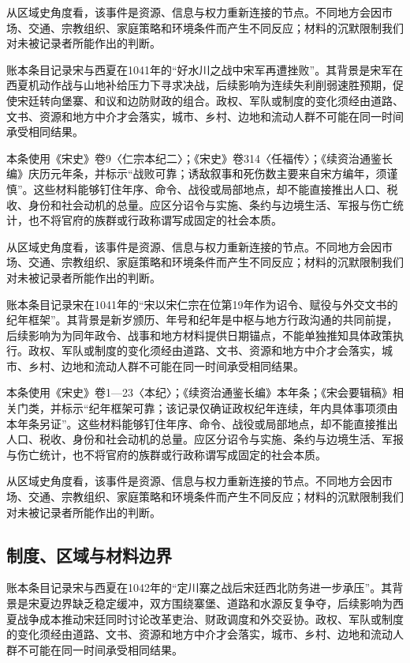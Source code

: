 从区域史角度看，该事件是资源、信息与权力重新连接的节点。不同地方会因市场、交通、宗教组织、家庭策略和环境条件而产生不同反应；材料的沉默限制我们对未被记录者所能作出的判断。

账本条目记录宋与西夏在1041年的“好水川之战中宋军再遭挫败”。其背景是宋军在西夏机动作战与山地补给压力下寻求决战，后续影响为连续失利削弱速胜预期，促使宋廷转向堡寨、和议和边防财政的组合。政权、军队或制度的变化须经由道路、文书、资源和地方中介才会落实，城市、乡村、边地和流动人群不可能在同一时间承受相同结果。

本条使用《宋史》卷9〈仁宗本纪二〉；《宋史》卷314〈任福传〉；《续资治通鉴长编》庆历元年条，并标示“战败可靠；诱敌叙事和死伤数主要来自宋方编年，须谨慎”。这些材料能够钉住年序、命令、战役或局部地点，却不能直接推出人口、税收、身份和社会动机的总量。应区分诏令与实施、条约与边境生活、军报与伤亡统计，也不将官府的族群或行政称谓写成固定的社会本质。

从区域史角度看，该事件是资源、信息与权力重新连接的节点。不同地方会因市场、交通、宗教组织、家庭策略和环境条件而产生不同反应；材料的沉默限制我们对未被记录者所能作出的判断。

账本条目记录宋在1041年的“宋以宋仁宗在位第19年作为诏令、赋役与外交文书的纪年框架”。其背景是新岁颁历、年号和纪年是中枢与地方行政沟通的共同前提，后续影响为为同年政令、战事和地方材料提供日期锚点，不能单独推知具体政策执行。政权、军队或制度的变化须经由道路、文书、资源和地方中介才会落实，城市、乡村、边地和流动人群不可能在同一时间承受相同结果。

本条使用《宋史》卷1—23〈本纪〉；《续资治通鉴长编》本年条；《宋会要辑稿》相关门类，并标示“纪年框架可靠；该记录仅确证政权纪年连续，年内具体事项须由本年条另证”。这些材料能够钉住年序、命令、战役或局部地点，却不能直接推出人口、税收、身份和社会动机的总量。应区分诏令与实施、条约与边境生活、军报与伤亡统计，也不将官府的族群或行政称谓写成固定的社会本质。

从区域史角度看，该事件是资源、信息与权力重新连接的节点。不同地方会因市场、交通、宗教组织、家庭策略和环境条件而产生不同反应；材料的沉默限制我们对未被记录者所能作出的判断。

\subsection{制度、区域与材料边界}

账本条目记录宋与西夏在1042年的“定川寨之战后宋廷西北防务进一步承压”。其背景是宋夏边界缺乏稳定缓冲，双方围绕寨堡、道路和水源反复争夺，后续影响为西夏战争成本推动宋廷同时讨论改革吏治、财政调度和外交妥协。政权、军队或制度的变化须经由道路、文书、资源和地方中介才会落实，城市、乡村、边地和流动人群不可能在同一时间承受相同结果。

